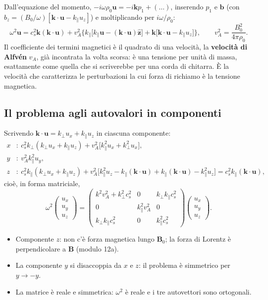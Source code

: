 Dall'equazione del momento, $-i\omega\rho_0\mathbf{u}=-i\mathbf{k}p_1+(\dots)$, inserendo $p_1$ e $\mathbf{b}$ (con $b_z=(B_0/\omega)[\mathbf{k}\cdot\mathbf{u}-k_\parallel u_z]$) e moltiplicando per $i\omega/\rho_0$:
\begin{equation}
\omega^2\mathbf{u}=c_s^2\mathbf{k}(\mathbf{k}\cdot\mathbf{u})+v_A^2\Big\{k_\parallel\big[k_\parallel\mathbf{u}-(\mathbf{k}\cdot\mathbf{u})\hat{\mathbf{z}}\big]+\mathbf{k}\big[\mathbf{k}\cdot\mathbf{u}-k_\parallel u_z\big]\Big\},\qquad
v_A^2=\frac{B_0^2}{4\pi\rho_0}.
\end{equation}
Il coefficiente dei termini magnetici è il quadrato di una velocità, la \textbf{velocità di Alfvén} $v_A$, già incontrata la volta scorsa: è una tensione per unità di massa, esattamente come quella che si scriverebbe per una corda di chitarra. È la velocità che caratterizza le perturbazioni la cui forza di richiamo è la tensione magnetica.

\subsection{Il problema agli autovalori in componenti}

Scrivendo $\mathbf{k}\cdot\mathbf{u}=k_\perp u_x+k_\parallel u_z$ in ciascuna componente:
\begin{align}
x&:\ c_s^2k_\perp(k_\perp u_x+k_\parallel u_z)+v_A^2\big[k_\parallel^2u_x+k_\perp^2u_x\big],\\
y&:\ v_A^2k_\parallel^2u_y,\\
z&:\ c_s^2k_\parallel(k_\perp u_x+k_\parallel u_z)+v_A^2\big[k_\parallel^2u_z-k_\parallel(\mathbf{k}\cdot\mathbf{u})+k_\parallel(\mathbf{k}\cdot\mathbf{u})-k_\parallel^2u_z\big]=c_s^2k_\parallel(\mathbf{k}\cdot\mathbf{u}),
\end{align}
cioè, in forma matriciale,
\begin{equation}
\omega^2\begin{pmatrix}u_x\\u_y\\u_z\end{pmatrix}=
\begin{pmatrix}
k^2v_A^2+k_\perp^2c_s^2 & 0 & k_\perp k_\parallel c_s^2\\
0 & k_\parallel^2v_A^2 & 0\\
k_\perp k_\parallel c_s^2 & 0 & k_\parallel^2c_s^2
\end{pmatrix}
\begin{pmatrix}u_x\\u_y\\u_z\end{pmatrix}.
\end{equation}
\begin{itemize}
\item Componente $z$: non c'è forza magnetica lungo $\mathbf{B}_0$; la forza di Lorentz è perpendicolare a $\mathbf{B}$ (modulo 12a).
\item La componente $y$ si disaccoppia da $x$ e $z$: il problema è simmetrico per $y\to-y$.
\item La matrice è reale e simmetrica: $\omega^2$ è reale e i tre autovettori sono ortogonali.
\end{itemize}

